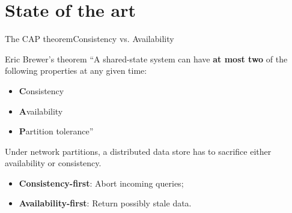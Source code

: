 \section{State of the art}


\begin{frame}{The CAP theorem}{Consistency vs. Availability}

\begin{block}{Eric Brewer's theorem}
``A shared-state system can have \textbf{at most two} of the following properties at any given time:

\begin{itemize}
	\item \textbf{C}onsistency
	\item \textbf{A}vailability
	\item \textbf{P}artition tolerance''
\end{itemize}
\end{block}


\begin{center}
\Large 
Under network partitions, a distributed data store has to sacrifice either availability or consistency.
\end{center}
\vfill

\begin{itemize}
	\item \textbf{Consistency-first}: Abort incoming queries;
	\item \textbf{Availability-first}: Return possibly stale data.
\end{itemize}

\end{frame}

